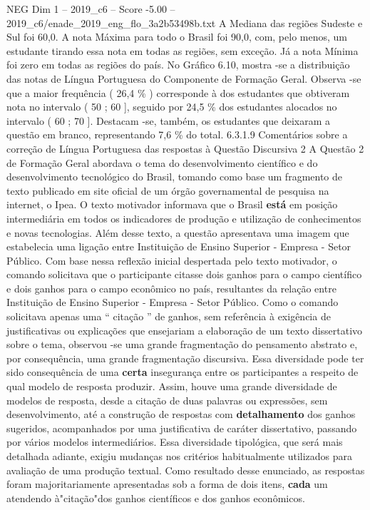 \begin{textsample}{NEG Dim 1 – 2019\_c6 – Score -5.00 – 2019\_c6/enade\_2019\_eng\_flo\_3a2b53498b.txt}
A Mediana das regiões Sudeste e Sul foi 60,0.
A nota Máxima para todo o Brasil foi 90,0, com, pelo menos, um estudante tirando essa nota em todas as regiões, sem exceção.
Já a nota Mínima foi zero em todas as regiões do país.
No Gráfico 6.10, mostra -se a distribuição das notas de Língua Portuguesa do Componente de Formação Geral.
Observa -se que a maior frequência ( 26,4 \% ) corresponde à dos estudantes que obtiveram nota no intervalo ( 50 ; 60 ], seguido por 24,5 \% dos estudantes alocados no intervalo ( 60 ; 70 ].
Destacam -se, também, os estudantes que deixaram a questão em branco, representando 7,6 \% do total. 6.3.1.9 Comentários sobre a correção de Língua Portuguesa das respostas à Questão Discursiva 2 A Questão 2 de Formação Geral abordava o tema do desenvolvimento científico e do desenvolvimento tecnológico do Brasil, tomando como base um fragmento de texto publicado em site oficial de um órgão governamental de pesquisa na internet, o Ipea.
O texto motivador informava que o Brasil \textbf{está} em posição intermediária em todos os indicadores de produção e utilização de conhecimentos e novas tecnologias.
Além desse texto, a questão apresentava uma imagem que estabelecia uma ligação entre Instituição de Ensino Superior - Empresa - Setor Público.
Com base nessa reflexão inicial despertada pelo texto motivador, o comando solicitava que o participante citasse dois ganhos para o campo científico e dois ganhos para o campo econômico no país, resultantes da relação entre Instituição de Ensino Superior - Empresa - Setor Público.
Como o comando solicitava apenas uma “ citação ” de ganhos, sem referência à exigência de justificativas ou explicações que ensejariam a elaboração de um texto dissertativo sobre o tema, observou -se uma grande fragmentação do pensamento abstrato e, por consequência, uma grande fragmentação discursiva.
Essa diversidade pode ter sido consequência de uma \textbf{certa} insegurança entre os participantes a respeito de qual modelo de resposta produzir.
Assim, houve uma grande diversidade de modelos de resposta, desde a citação de duas palavras ou expressões, sem desenvolvimento, até a construção de respostas com \textbf{detalhamento} dos ganhos sugeridos, acompanhados por uma justificativa de caráter dissertativo, passando por vários modelos intermediários.
Essa diversidade tipológica, que será mais detalhada adiante, exigiu mudanças nos critérios habitualmente utilizados para avaliação de uma produção textual.
Como resultado desse enunciado, as respostas foram majoritariamente apresentadas sob a forma de dois itens, \textbf{cada} um atendendo à"citação"dos ganhos científicos e dos ganhos econômicos.

\end{textsample}
